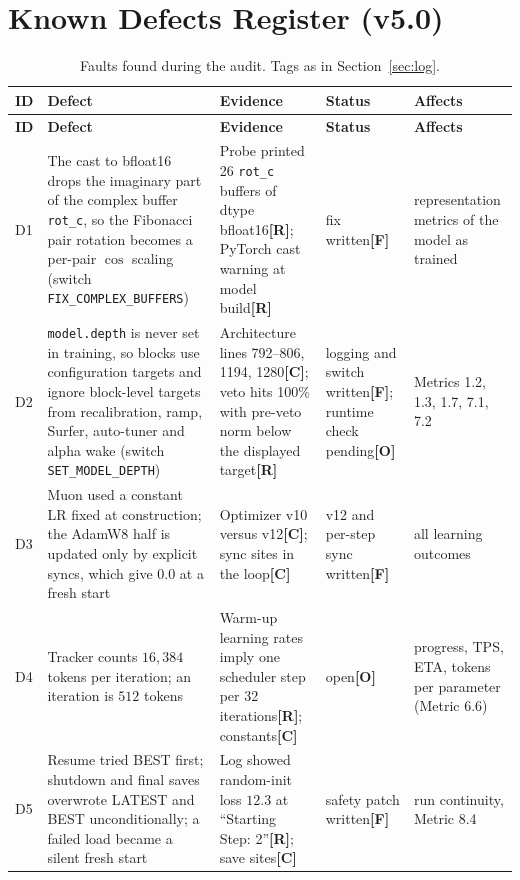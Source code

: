 \documentclass[11pt,a4paper]{article}
\newcommand{\sR}{\textbf{[R]}}
\newcommand{\sC}{\textbf{[C]}}
\newcommand{\sF}{\textbf{[F]}}
\newcommand{\sO}{\textbf{[O]}}
\begin{document}
\section{Known Defects Register (v5.0)}\label{sec:defects}

\begingroup\small\setlength{\tabcolsep}{4pt}
\begin{longtable}{>{\raggedright\arraybackslash}p{0.7cm} >{\raggedright\arraybackslash}p{5.3cm} >{\raggedright\arraybackslash}p{4.4cm} >{\raggedright\arraybackslash}p{2.0cm} >{\raggedright\arraybackslash}p{2.6cm}}
\caption{Faults found during the audit. Tags as in Section~\ref{sec:log}.}\label{tab:defects}\\
\toprule
\textbf{ID} & \textbf{Defect} & \textbf{Evidence} & \textbf{Status} & \textbf{Affects}\\
\midrule
\endfirsthead
\toprule
\textbf{ID} & \textbf{Defect} & \textbf{Evidence} & \textbf{Status} & \textbf{Affects}\\
\midrule
\endhead
\bottomrule
\endfoot
D1 & The cast to bfloat16 drops the imaginary part of the complex buffer \texttt{rot\_c}, so the Fibonacci pair rotation becomes a per-pair $\cos$ scaling (switch \texttt{FIX\_COMPLEX\_BUFFERS}) & Probe printed 26 \texttt{rot\_c} buffers of dtype bfloat16\sR{}; PyTorch cast warning at model build\sR{} & fix written\sF{} & representation metrics of the model as trained\\
D2 & \texttt{model.depth} is never set in training, so blocks use configuration targets and ignore block-level targets from recalibration, ramp, Surfer, auto-tuner and alpha wake (switch \texttt{SET\_MODEL\_DEPTH}) & Architecture lines 792--806, 1194, 1280\sC{}; veto hits 100\% with pre-veto norm below the displayed target\sR{} & logging and switch written\sF{}; runtime check pending\sO{} & Metrics 1.2, 1.3, 1.7, 7.1, 7.2\\
D3 & Muon used a constant LR fixed at construction; the AdamW8 half is updated only by explicit syncs, which give $0.0$ at a fresh start & Optimizer v10 versus v12\sC{}; sync sites in the loop\sC{} & v12 and per-step sync written\sF{} & all learning outcomes\\
D4 & Tracker counts $16{,}384$ tokens per iteration; an iteration is $512$ tokens & Warm-up learning rates imply one scheduler step per 32 iterations\sR{}; constants\sC{} & open\sO{} & progress, TPS, ETA, tokens per parameter (Metric 6.6)\\
D5 & Resume tried BEST first; shutdown and final saves overwrote LATEST and BEST unconditionally; a failed load became a silent fresh start & Log showed random-init loss $12.3$ at ``Starting Step: 2''\sR{}; save sites\sC{} & safety patch written\sF{} & run continuity, Metric 8.4\\

\end{longtable}
\end{document}
